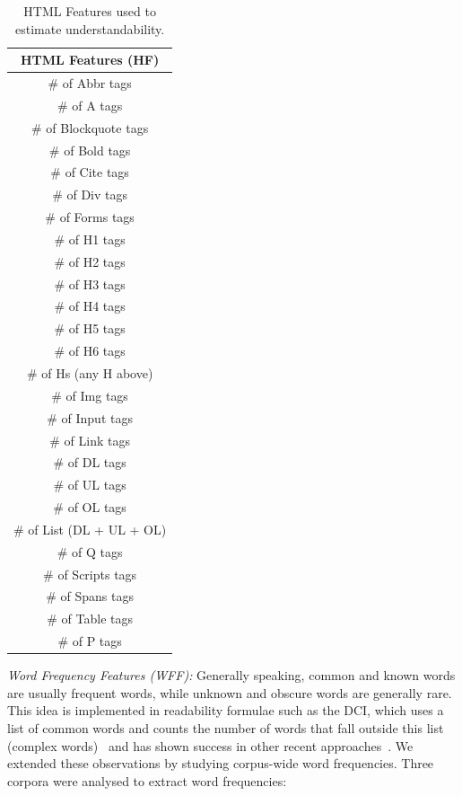 \documentclass[10pt,a4paper]{article}
\begin{document}
\begin{table}
\caption{HTML Features used to estimate understandability.}
\label{tab:doc_features_hf} \vspace{-10pt}
\begin{tabular}{c}
\toprule 
\textbf{HTML Features (HF)}\tabularnewline
\midrule 
\# of Abbr tags\tabularnewline
\# of A tags\tabularnewline
\# of Blockquote tags\tabularnewline
\# of Bold tags\tabularnewline
\# of Cite tags\tabularnewline
\# of Div tags\tabularnewline
\# of Forms tags\tabularnewline
\# of H1 tags\tabularnewline
\# of H2 tags\tabularnewline
\# of H3 tags\tabularnewline
\# of H4 tags\tabularnewline
\# of H5 tags\tabularnewline
\# of H6 tags\tabularnewline
\# of Hs (any H above)\tabularnewline
\# of Img tags\tabularnewline
\# of Input tags\tabularnewline
\# of Link tags\tabularnewline
\# of DL tags\tabularnewline
\# of UL tags\tabularnewline
\# of OL tags\tabularnewline
\# of List (DL + UL + OL)\tabularnewline
\# of Q tags\tabularnewline
\# of Scripts tags\tabularnewline
\# of Spans tags\tabularnewline
\# of Table tags\tabularnewline
\# of P tags\tabularnewline
\bottomrule
\end{tabular}
\end{table}

\textit{Word Frequency Features (WFF):}
Generally speaking, common and known words are usually frequent words, while unknown and obscure words are generally rare. This idea is implemented in readability formulae such as the DCI, which uses a list of common words and counts the number of words that fall outside this list (complex words)~\cite{dale48} and has shown success in other recent approaches~\cite{elhadad06,wu15}.
We extended these observations by studying corpus-wide word frequencies. 
Three corpora were analysed to extract word frequencies:
\end{document}

